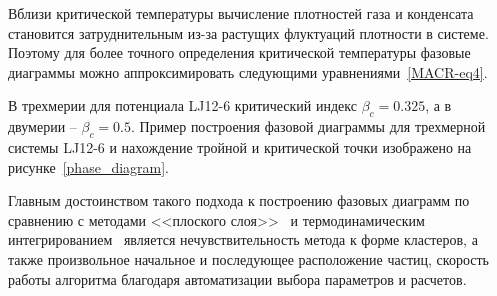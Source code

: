 \begin{table}[h!]
    \caption{Значения тройных и критических точек, а также коэффициентов фитирования $A$ и $a$ из уравнений \eqref{MACR-eq4} для двумерных и трехмерных систем Леннарда-Джонса, рассматриваемых в данной работе.}
    \label{PRIMe-Table2}
\end{table}



Вблизи критической температуры вычисление плотностей газа и конденсата становится затруднительным из-за растущих флуктуаций плотности в системе.
Поэтому для более точного определения критической температуры фазовые диаграммы можно аппроксимировать следующими уравнениями~\ref{MACR-eq4}.

В трехмерии для потенциала LJ12-6 критический индекс $\beta_c = 0.325$, а в двумерии -- $\beta_c = 0.5$.
Пример построения фазовой диаграммы для трехмерной системы LJ12-6 и нахождение тройной и критической точки изображено на рисунке~\ref{phase_diagram}.

Главным достоинством такого подхода к построению фазовых диаграмм по сравнению с методами <<плоского слоя>>~\cite{10.1021/jp806127j, 10.1021/jp1117213} и термодинамическим интегрированием~\cite{10.1088/0953-8984/21/46/465104} является нечувствительность метода к форме кластеров, а также произвольное начальное и последующее расположение частиц, скорость работы алгоритма благодаря автоматизации выбора параметров и расчетов.



